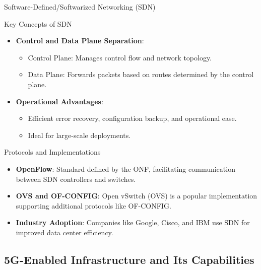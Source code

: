 \documentclass[9pt,handout]{beamer}
\begin{document}
\begin{frame}{Software-Defined/Softwarized Networking (SDN)}

\begin{block}{Key Concepts of SDN}
    \begin{itemize}
        \item \textbf{Control and Data Plane Separation}:
            \begin{itemize}
                \item Control Plane: Manages control flow and network topology.
                \item Data Plane: Forwards packets based on routes determined by the control plane.
            \end{itemize}
        \item \textbf{Operational Advantages}:
            \begin{itemize}
                \item Efficient error recovery, configuration backup, and operational ease.
                \item Ideal for large-scale deployments.
            \end{itemize}
    \end{itemize}
\end{block}

\begin{block}{Protocols and Implementations}
    \begin{itemize}
        \item \textbf{OpenFlow}: Standard defined by the ONF, facilitating communication between SDN controllers and switches.
        \item \textbf{OVS and OF-CONFIG}: Open vSwitch (OVS) is a popular implementation supporting additional protocols like OF-CONFIG.
        \item \textbf{Industry Adoption}: Companies like Google, Cisco, and IBM use SDN for improved data center efficiency.
    \end{itemize}
\end{block}

\end{frame}

\subsection{5G-Enabled Infrastructure and Its Capabilities}
\end{document}
